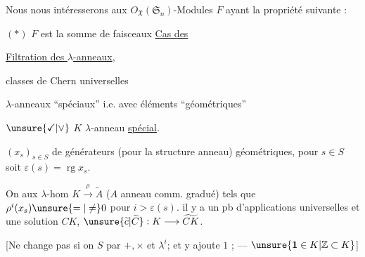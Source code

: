 Nous nous intéresserons aux $O_{\mathfrak X}(\mathfrak S_n)$-Modules $F$ ayant la propriété suivante :

$(*)$ $F$ est la somme de faisceaux
\uline{Cas des }

\uline{Filtration des $\lambda$-anneaux},

classes de Chern universelles

$\lambda$-anneaux ``spéciaux'' i.e. avec éléments ``géométriques''

\quad $\unsure{\checkmark|\vee}$
$K$ $\lambda$-anneau  \uline{spécial}.

$(x_s)_{s\in S}$   de générateurs (pour la structure anneau) géométriques, pour $s\in S$ soit $\varepsilon(s)=\operatorname{rg}x_s$.

On  aux $\lambda$-hom $K\xrightarrow{\rho}\widetilde A$ ($A$ anneau comm. gradué) tels que $\rho^i(x_s)\unsure{=|\ne}0$ pour $i>\varepsilon(s)$.
 il y a un pb d'applications universelles et une solution  $CK$, $\unsure{\widetilde c|\widetilde C}:K\longrightarrow\widetilde{CK}$.

[Ne change pas si  on  $S$ par $+,\times$ et $\lambda^i$; et y ajoute $1$ ; ---  $\unsure{\mathbf1\in K|\mathbb Z\subset K}$]

